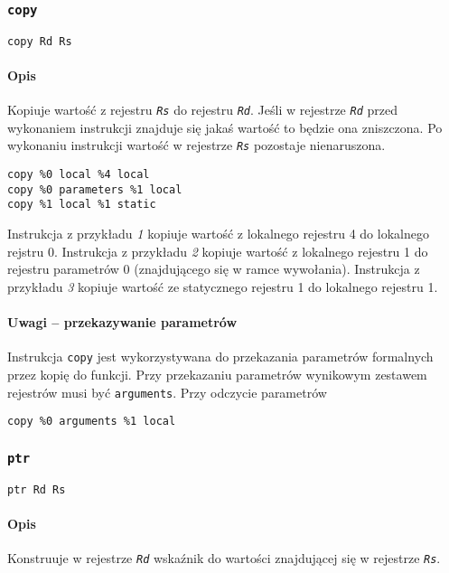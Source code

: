 \subsubsection{\texttt{copy}}

\begin{lstlisting}
copy Rd Rs
\end{lstlisting}

\paragraph*{Opis} Kopiuje wartość z rejestru \texttt{\emph{Rs}} do rejestru
\texttt{\emph{Rd}}. Jeśli w rejestrze \texttt{\emph{Rd}} przed wykonaniem
instrukcji znajduje się jakaś wartość to będzie ona zniszczona. Po wykonaniu
instrukcji wartość w rejestrze \texttt{\emph{Rs}} pozostaje nienaruszona.

\begin{lstlisting}
copy %0 local %4 local
copy %0 parameters %1 local
copy %1 local %1 static
\end{lstlisting}

Instrukcja z przykładu \emph{1} kopiuje wartość z lokalnego rejestru 4 do
lokalnego rejstru 0.
Instrukcja z przykładu \emph{2} kopiuje wartość z lokalnego rejestru 1 do
rejestru parametrów 0 (znajdującego się w ramce wywołania).
Instrukcja z przykładu \emph{3} kopiuje wartość ze statycznego rejestru 1 do
lokalnego rejestru 1.

\paragraph*{Uwagi -- przekazywanie parametrów} Instrukcja \texttt{copy} jest
wykorzystywana do przekazania parametrów formalnych przez kopię do funkcji.
Przy przekazaniu parametrów wynikowym zestawem rejestrów musi być
\texttt{arguments}. Przy odczycie parametrów
\begin{lstlisting}
copy %0 arguments %1 local
\end{lstlisting}

\subsubsection{\texttt{ptr}}

\begin{lstlisting}
ptr Rd Rs
\end{lstlisting}

\paragraph*{Opis} Konstruuje w rejestrze \texttt{\emph{Rd}} wskaźnik do wartości
znajdującej się w rejestrze \texttt{\emph{Rs}}.

